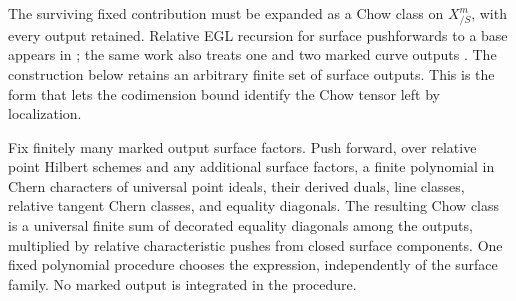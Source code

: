 The surviving fixed contribution must be expanded as a Chow class on
\(X^m_{/S}\), with every output retained.  Relative EGL recursion for
surface pushforwards to a base appears in
\cite[Section~2.1, Lemma~2.1 and Proposition~2.2]{Kong2026};
the same work also treats one and two marked curve outputs
\cite[Section~3.3, Lemma~3.4]{Kong2026}.
The construction below retains an arbitrary finite set of surface
outputs.  This is the form that lets the codimension bound identify
the Chow tensor left by localization.

\begin{lemma}
\label{lem:marked-universality}
Fix finitely many marked output surface factors.
Push forward, over relative point Hilbert schemes and any additional
surface factors, a finite polynomial in Chern characters of universal
point ideals, their derived duals, line classes, relative tangent Chern
classes, and equality diagonals.
The resulting Chow class is a universal finite sum of decorated
equality diagonals among the outputs, multiplied by relative
characteristic pushes from closed surface components.
One fixed polynomial procedure chooses the expression, independently
of the surface family. No marked output is integrated in the procedure.
\end{lemma}

